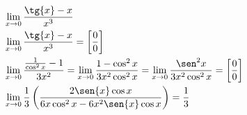 \begin{ex}
\begin{align}
&\lim_{x\rightarrow 0} \frac{\tg{x}-x}{x^3}\nonumber\\
&\lim_{x\rightarrow 0} \frac{\tg{x}-x}{x^3}=\left[\frac{0}{0}\right]\nonumber\\
&\lim_{x\rightarrow 0} \frac{\frac{1}{\cos^2{x}}-1}{3x^2}=\lim_{x\rightarrow 0} \frac{1-\cos^2{x}}{3x^2\cos^2{x}}=\lim_{x\rightarrow 0} \frac{\sen^2{x}}{3x^2\cos^2{x}}=\left[\frac{0}{0}\right]\nonumber\\
&\lim_{x\rightarrow 0} \frac{1}{3} \left(\frac{2\sen{x}\cos{x}}{6x\cos^2{x}-6x^2\sen{x}\cos{x}}\right)=\frac{1}{3}\nonumber
\end{align}
\end{ex}